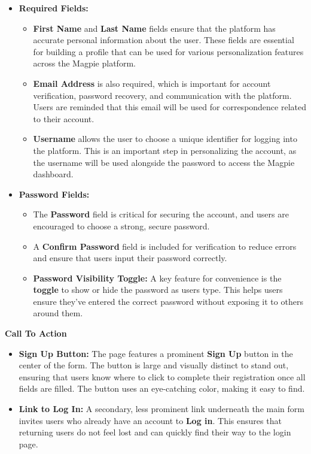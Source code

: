 \begin{itemize}
    \item{} \textbf{Required Fields:}
    \begin{itemize}
        \item{} \textbf{First Name} and \textbf{Last Name} fields ensure that
        the platform has accurate personal information about the user. These
        fields are essential for building a profile that can be used for various
        personalization features across the Magpie platform. 
        \item{} \textbf{Email Address} is also required, which is important for
        account verification, password recovery, and communication with the
        platform. Users are reminded that this email will be used for
        correspondence related to their account.
        \item{} \textbf{Username} allows the user to choose a unique identifier
        for logging into the platform. This is an important step in
        personalizing the account, as the username will be used alongside the
        password to access the Magpie dashboard. 
    \end{itemize}
    \item{} \textbf{Password Fields:}
    \begin{itemize}
        \item{} The \textbf{Password} field is critical for securing the
        account, and users are encouraged to choose a strong, secure password.
        \item{} A \textbf{Confirm Password} field is included for verification
        to reduce errors and ensure that users input their password correctly.
        \item{} \textbf{Password Visibility Toggle:} A key feature for
        convenience is the \textbf{toggle} to show or hide the password as users
        type. This helps users ensure they've entered the correct password
        without exposing it to others around them.
    \end{itemize}
\end{itemize}

\textbf{Call To Action}

\begin{itemize}
    \item{}  \textbf{Sign Up Button:} The page features a prominent \textbf{Sign
    Up} button in the center of the form. The button is large and visually
    distinct to stand out, ensuring that users know where to click to complete
    their registration once all fields are filled. The button uses an
    eye{-}catching color, making it easy to find.
    \item{} \textbf{Link to Log In:} A secondary, less prominent link underneath
    the main form invites users who already have an account to \textbf{Log in}.
    This ensures that returning users do not feel lost and can quickly find
    their way to the login page.
\end{itemize}

